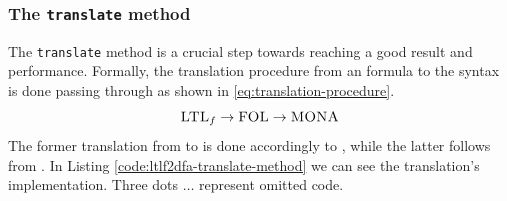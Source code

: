 \subsubsection{The \texttt{translate} method}
The \texttt{translate} method is a crucial step towards reaching a good result and performance. Formally, the translation procedure from an \LTLf formula to the \MONA syntax is done passing through \FOL as shown in \ref{eq:translation-procedure}.
\begin{equation}\label{eq:translation-procedure}
\textsc{LTL}_f \rightarrow \textsc{FOL} \rightarrow \textsc{MONA}
\end{equation}
The former translation from \LTLf to \FOL is done accordingly to \citep{de2013linear}, while the latter follows from \citep{monamanual2001}.
In Listing \ref{code:ltlf2dfa-translate-method} we can see the translation's implementation. Three dots $\dots$ represent omitted code.
